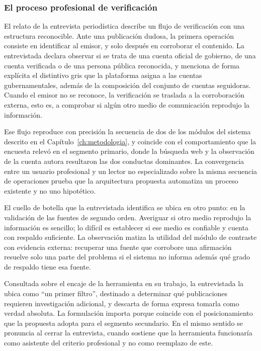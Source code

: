 \subsubsection{El proceso profesional de verificación}

El relato de la entrevista periodística describe un flujo de verificación con una estructura reconocible. Ante una publicación dudosa, la primera operación consiste en identificar al emisor, y solo después en corroborar el contenido. La entrevistada declara observar si se trata de una cuenta oficial de gobierno, de una cuenta verificada o de una persona pública reconocida, y menciona de forma explícita el distintivo gris que la plataforma asigna a las cuentas gubernamentales, además de la composición del conjunto de cuentas seguidoras. Cuando el emisor no se reconoce, la verificación se traslada a la corroboración externa, esto es, a comprobar si algún otro medio de comunicación reprodujo la información.

Ese flujo reproduce con precisión la secuencia de dos de los módulos del sistema descrito en el Capítulo~\ref{ch:metodologia}, y coincide con el comportamiento que la encuesta relevó en el segmento primario, donde la búsqueda web y la observación de la cuenta autora resultaron las dos conductas dominantes. La convergencia entre un usuario profesional y un lector no especializado sobre la misma secuencia de operaciones prueba que la arquitectura propuesta automatiza un proceso existente y no uno hipotético.

El cuello de botella que la entrevistada identifica se ubica en otro punto: en la validación de las fuentes de segundo orden. Averiguar si otro medio reprodujo la información es sencillo; lo difícil es establecer si ese medio es confiable y cuenta con respaldo suficiente. La observación matiza la utilidad del módulo de contraste con evidencia externa: recuperar una fuente que corrobore una afirmación resuelve solo una parte del problema si el sistema no informa además qué grado de respaldo tiene esa fuente.

Consultada sobre el encaje de la herramienta en su trabajo, la entrevistada la ubica como \enquote{un primer filtro}, destinado a determinar qué publicaciones requieren investigación adicional, y descarta de forma expresa tomarla como verdad absoluta. La formulación importa porque coincide con el posicionamiento que la propuesta adopta para el segmento secundario. En el mismo sentido se pronuncia al cerrar la entrevista, cuando sostiene que la herramienta funcionaría como asistente del criterio profesional y no como reemplazo de este.

